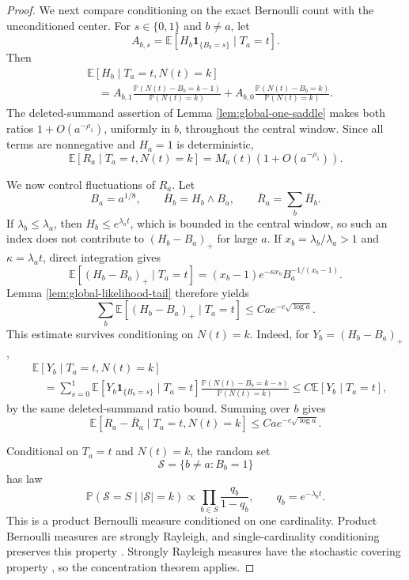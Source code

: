 \documentclass[11pt]{article}
\theoremstyle{remark}
\newcommand{\Pp}{\mathbb P}
\newcommand{\Ee}{\mathbb E}
\newcommand{\one}{\mathbf 1}
\begin{document}
\begin{proof}
We next compare conditioning on the exact Bernoulli count with the
unconditioned center.  For $s\in\{0,1\}$ and $b\ne a$, let
\[
        A_{b,s}=\Ee[H_b\one_{\{B_b=s\}}\mid T_a=t].
\]
Then
\[
\begin{aligned}
&\Ee[H_b\mid T_a=t,N(t)=k]\\
&\quad=A_{b,1}
        \frac{\Pp(N(t)-B_b=k-1)}{\Pp(N(t)=k)}
        +A_{b,0}
        \frac{\Pp(N(t)-B_b=k)}{\Pp(N(t)=k)}.
\end{aligned}
\]
The deleted-summand assertion of Lemma \ref{lem:global-one-saddle} makes both
ratios $1+O(a^{-\rho_1})$, uniformly in $b$, throughout the central window.
Since all terms are nonnegative and $H_a=1$ is deterministic,
\[
        \Ee[R_a\mid T_a=t,N(t)=k]
        =M_a(t)(1+O(a^{-\rho_1})).
\]

We now control fluctuations of $R_a$.  Let
\[
        B_a=a^{1/8},
        \qquad
        \overline H_b=H_b\wedge B_a,
        \qquad
        \overline R_a=\sum_b\overline H_b.
\]
If $\lambda_b\le\lambda_a$, then
$H_b\le e^{\lambda_at}$, which is bounded in the central window, so such an
index does not contribute to $(H_b-B_a)_+$ for large $a$.  If
$x_b=\lambda_b/\lambda_a>1$ and $\kappa=\lambda_at$, direct integration gives
\[
        \Ee[(H_b-B_a)_+\mid T_a=t]
        =(x_b-1)e^{-\kappa x_b}B_a^{-1/(x_b-1)}.
\]
Lemma \ref{lem:global-likelihood-tail} therefore yields
\[
        \sum_b\Ee[(H_b-B_a)_+\mid T_a=t]
        \le Ca e^{-c\sqrt{\log a}}.
\]
This estimate survives conditioning on $N(t)=k$.  Indeed, for
$Y_b=(H_b-B_a)_+$,
\[
\begin{aligned}
&\Ee[Y_b\mid T_a=t,N(t)=k]\\
&\quad=\sum_{s=0}^1
 \Ee[Y_b\one_{\{B_b=s\}}\mid T_a=t]
 \frac{\Pp(N(t)-B_b=k-s)}{\Pp(N(t)=k)}
 \le C\Ee[Y_b\mid T_a=t],
\end{aligned}
\]
by the same deleted-summand ratio bound.  Summing over $b$ gives
\begin{equation}
        \Ee[R_a-\overline R_a\mid T_a=t,N(t)=k]
        \le Ca e^{-c\sqrt{\log a}}.
\label{eq:global-conditioned-truncation-tail}
\end{equation}

Conditional on $T_a=t$ and $N(t)=k$, the random set
\[
        \mathcal S=\{b\ne a:B_b=1\}
\]
has law
\[
        \Pp(\mathcal S=S\mid |\mathcal S|=k)
        \propto\prod_{b\in S}\frac{q_b}{1-q_b},
        \qquad q_b=e^{-\lambda_bt}.
\]
This is a product Bernoulli measure conditioned on one cardinality.  Product
Bernoulli measures are strongly Rayleigh, and single-cardinality conditioning
preserves this property \cite[Corollary 4.18]{BBL2009}.  Strongly Rayleigh
measures have the stochastic covering property
\cite[Proposition 2.2]{PemantlePeres2014}, so the concentration theorem
\cite[Theorem 3.1]{PemantlePeres2014} applies.


\end{proof}
\end{document}
